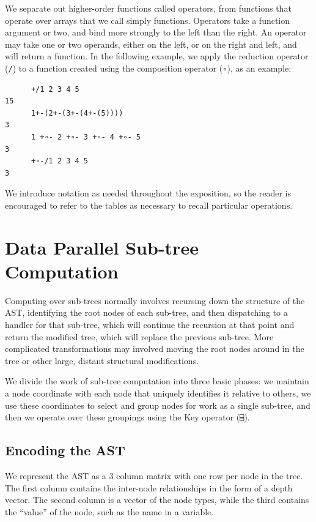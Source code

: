 ﻿\documentclass[numbers,10pt,preprint]{sigplanconf}
\begin{document}
We separate out higher-order functions called operators, from functions that operate over arrays that we call simply functions. Operators take a function argument or two, and bind more strongly to the left than the right. An operator may take one or two operands, either on the left, or on the right and left, and will return a function. In the following example, we apply the reduction operator (\verb;/;) to a function created using the composition operator (\verb;∘;), as an example:

\begin{verbatim}
      +/1 2 3 4 5
15
      1+-(2+-(3+-(4+-(5))))
3
      1 +∘- 2 +∘- 3 +∘- 4 +∘- 5
3
      +∘-/1 2 3 4 5
3
\end{verbatim}

\noindent We introduce notation as needed throughout the exposition, so the reader is encouraged to refer to the tables as necessary to recall particular operations.

\section{Data Parallel Sub-tree Computation}

Computing over sub-trees normally involves recursing down the structure of the AST, identifying the root nodes of each sub-tree, and then dispatching to a handler for that sub-tree, which will continue the recursion at that point and return the modified tree, which will replace the previous sub-tree. More complicated transformations may involved moving the root nodes around in the tree or other large, distant structural modifications.

We divide the work of sub-tree computation into three basic phases: we maintain a node coordinate with each node that uniquely identifies it relative to others, we use these coordinates to select and group nodes for work as a single sub-tree, and then we operate over these groupings using the Key operator (\verb;⌸;).

\subsection{Encoding the AST}

We represent the AST as a 3 column matrix with one row per node in the tree. The first column contains the inter-node relationships in the form of a depth vector. The second column is a vector of the node types, while the third contains the ``value'' of the node, such as the name in a variable.
\end{document}
